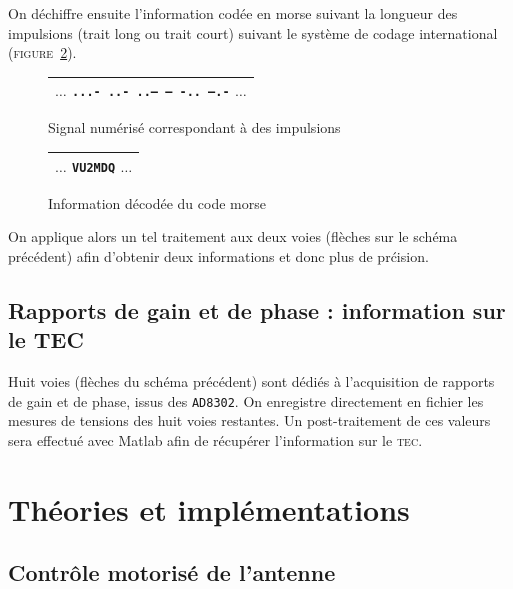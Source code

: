 \documentclass[twocolumn,pre,floats,aps,amsmath,amssymb]{revtex4}
\begin{document}
On d\'echiffre ensuite l'information cod\'ee en morse suivant la longueur des impulsions (trait long ou trait court) suivant le syst\`eme de codage international (\textsc{figure}~\ref{fig:info_decode_morse}).

\begin{figure}[]
  \begin{tabular}{|c|}
    \hline
    $\dots$ \textcolor{rltred}{\texttt{...- ..- ..--- -- -.. --.-}} $\dots$\\
    \hline
  \end{tabular}
  \caption{Signal num\'eris\'e correspondant \`a des impulsions}
  \label{fig:impulsions_morse}
\end{figure}

\begin{figure}[]
  \begin{tabular}{|c|}
    \hline
    $\dots$ \textcolor{rltgreen}{\texttt{VU2MDQ}} $\dots$\\
    \hline
  \end{tabular}
  \caption{Information d\'ecod\'ee du code morse}
  \label{fig:info_decode_morse}
\end{figure}

On applique alors un tel traitement aux deux voies (fl\`eches { \color{rltgreen}{vertes} } sur le sch\'ema pr\'ec\'edent) afin d'obtenir deux informations et donc plus de pr\'cision.

\subsection{Rapports de gain et de phase : information sur le TEC}

Huit voies (fl\`eches { \color{oneblue}{bleues} } du sch\'ema pr\'ec\'edent) sont d\'edi\'es \`a l'acquisition de rapports de gain et de phase, issus des \texttt{AD8302}. On enregistre directement en fichier les mesures de tensions des huit voies restantes. Un post-traitement de ces valeurs sera effectu\'e avec Matlab afin de r\'ecup\'erer l'information sur le \textsc{tec}.

\section{Th\'eories et impl\'ementations}
\label{sec:theory}

\subsection{Contr\^ole motoris\'e de l'antenne}
\end{document}
